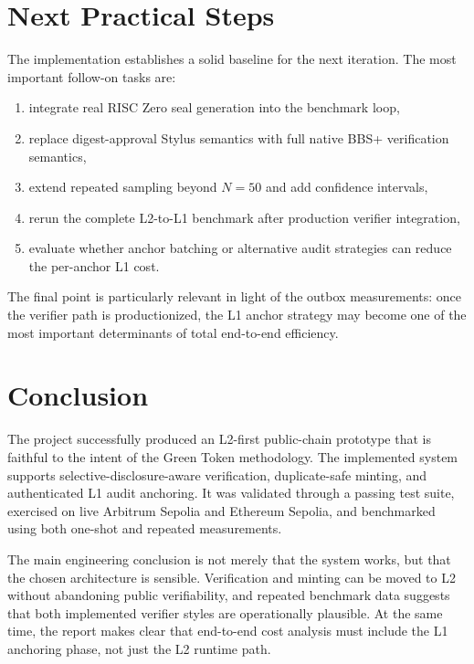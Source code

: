\documentclass[11pt]{article}
\begin{document}
\section{Next Practical Steps}

The implementation establishes a solid baseline for the next iteration. The most important follow-on tasks are:

\begin{enumerate}
  \item integrate real RISC Zero seal generation into the benchmark loop,
  \item replace digest-approval Stylus semantics with full native BBS+ verification semantics,
  \item extend repeated sampling beyond \(N = 50\) and add confidence intervals,
  \item rerun the complete L2-to-L1 benchmark after production verifier integration,
  \item evaluate whether anchor batching or alternative audit strategies can reduce the per-anchor L1 cost.
\end{enumerate}

The final point is particularly relevant in light of the outbox measurements: once the verifier path is productionized, the L1 anchor strategy may become one of the most important determinants of total end-to-end efficiency.

\section{Conclusion}

The project successfully produced an L2-first public-chain prototype that is faithful to the intent of the Green Token methodology. The implemented system supports selective-disclosure-aware verification, duplicate-safe minting, and authenticated L1 audit anchoring. It was validated through a passing test suite, exercised on live Arbitrum Sepolia and Ethereum Sepolia, and benchmarked using both one-shot and repeated measurements.

The main engineering conclusion is not merely that the system works, but that the chosen architecture is sensible. Verification and minting can be moved to L2 without abandoning public verifiability, and repeated benchmark data suggests that both implemented verifier styles are operationally plausible. At the same time, the report makes clear that end-to-end cost analysis must include the L1 anchoring phase, not just the L2 runtime path.
\end{document}
